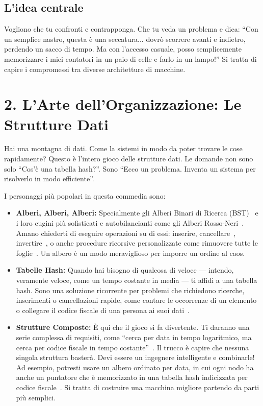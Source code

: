 \documentclass[a4paper, 11pt]{article}
\begin{document}
\subsection*{L'idea centrale}
Vogliono che tu confronti e contrapponga. Che tu veda un problema e dica: ``Con un semplice nastro, questa è una seccatura... dovrò scorrere avanti e indietro, perdendo un sacco di tempo. Ma con l'accesso casuale, posso semplicemente memorizzare i miei contatori in un paio di celle e farlo in un lampo!'' Si tratta di capire i compromessi tra diverse architetture di macchine.

\section*{2. L'Arte dell'Organizzazione: Le Strutture Dati}

Hai una montagna di dati. Come la sistemi in modo da poter trovare le cose rapidamente? Questo è l'intero gioco delle strutture dati. Le domande non sono solo ``Cos'è una tabella hash?''. Sono ``Ecco un problema. Inventa un sistema per risolverlo in modo efficiente''.

I personaggi più popolari in questa commedia sono:
\begin{itemize}
    \item \textbf{Alberi, Alberi, Alberi:} Specialmente gli Alberi Binari di Ricerca (BST)~\cite{esame_15_01_25_bst} e i loro cugini più sofisticati e autobilancianti come gli Alberi Rosso-Neri~\cite{esame_12_02_24_rbtree}. Amano chiederti di eseguire operazioni su di essi: inserire, cancellare~\cite{esame_15_01_25_bst_ops}, invertire~\cite{esame_19_06_23_invert}, o anche procedure ricorsive personalizzate come rimuovere tutte le foglie~\cite{esame_19_06_23_leaves}. Un albero è un modo meraviglioso per imporre un ordine al caos.
    
    \item \textbf{Tabelle Hash:} Quando hai bisogno di qualcosa di veloce — intendo, veramente veloce, come un tempo costante in media — ti affidi a una tabella hash. Sono una soluzione ricorrente per problemi che richiedono ricerche, inserimenti o cancellazioni rapide, come contare le occorrenze di un elemento~\cite{esame_20_06_24_hash} o collegare il codice fiscale di una persona ai suoi dati~\cite{esame_12_02_24_composite}.
    
    \item \textbf{Strutture Composte:} È qui che il gioco si fa divertente. Ti daranno una serie complessa di requisiti, come ``cerca per data in tempo logaritmico, ma cerca per codice fiscale in tempo costante''~\cite{esame_12_02_24_composite_req}. Il trucco è capire che nessuna singola struttura basterà. Devi essere un ingegnere intelligente e combinarle! Ad esempio, potresti usare un albero ordinato per data, in cui ogni nodo ha anche un puntatore che è memorizzato in una tabella hash indicizzata per codice fiscale~\cite{esame_12_02_24_composite}. Si tratta di costruire una macchina migliore partendo da parti più semplici.
\end{itemize}
\end{document}
